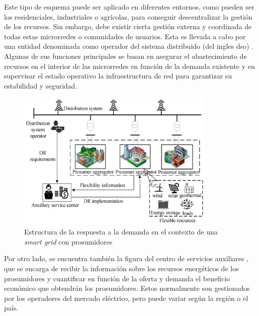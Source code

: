 Este tipo de esquema puede ser aplicado en diferentes entornos, como pueden ser los residenciales, industriales o agrícolas, para conseguir descentralizar la gestión de los recursos. Sin embargo, debe existir cierta gestión externa y coordinada de todas estas microrredes o comunidades de usuarios. Esta es llevada a cabo por una entidad denominada como operador del sistema distribuido (del ingles \gls{dso}) \cite{transactive} \cite{dso}. Algunas de sus funciones principales se basan en asegurar el abastecimiento de recursos en el interior de las microrredes en función de la demanda existente y en supervisar el estado operativo la infraestructura de red para garantizar su estabilidad y seguridad. 

\vspace{3mm}

\begin{figure}[h!]
  \centering
  \includegraphics[width=0.85\textwidth]{img/teoria/prosumer.jpg}
  \caption{Estructura de la respuesta a la demanda en el contexto de una \textit{smart grid} con prosumidores \cite{transactive}}
  \label{fig:prosumer}
\end{figure}

\vspace{3mm}

Por otro lado, se encuentra también la figura del centro de servicios auxiliares \cite{transactive}, que se encarga de recibir la información sobre los recursos energéticos de los prosumidores y cuantificar en función de la oferta y demanda el beneficio económico que obtendrán los prosumidores. Estos normalmente son gestionados por los operadores del mercado eléctrico, pero puede variar según la región o el país.

\vspace{3mm}

